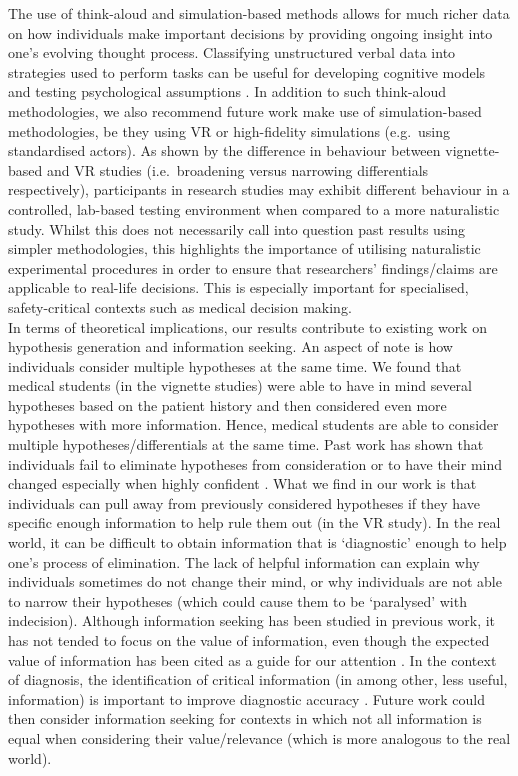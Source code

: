 \documentclass[a4paper, nobind]{templates/ociamthesis}
\begin{document}
The use of think-aloud and simulation-based methods allows for much richer data on how individuals make important decisions by providing ongoing insight into one's evolving thought process. Classifying unstructured verbal data into strategies used to perform tasks can be useful for developing cognitive models and testing psychological assumptions \autocite{ostrovsky_verbal_2024}. In addition to such think-aloud methodologies, we also recommend future work make use of simulation-based methodologies, be they using VR or high-fidelity simulations (e.g.~using standardised actors). As shown by the difference in behaviour between vignette-based and VR studies (i.e.~broadening versus narrowing differentials respectively), participants in research studies may exhibit different behaviour in a controlled, lab-based testing environment when compared to a more naturalistic study. Whilst this does not necessarily call into question past results using simpler methodologies, this highlights the importance of utilising naturalistic experimental procedures in order to ensure that researchers' findings/claims are applicable to real-life decisions. This is especially important for specialised, safety-critical contexts such as medical decision making.\\

In terms of theoretical implications, our results contribute to existing work on hypothesis generation and information seeking. An aspect of note is how individuals consider multiple hypotheses at the same time. We found that medical students (in the vignette studies) were able to have in mind several hypotheses based on the patient history and then considered even more hypotheses with more information. Hence, medical students are able to consider multiple hypotheses/differentials at the same time. Past work has shown that individuals fail to eliminate hypotheses from consideration \autocite{wason_failure_1960} or to have their mind changed \autocite{akaishi_autonomous_2014} especially when highly confident \autocite{rollwage_confidence_2020,pescetelli_confidence_2021}. What we find in our work is that individuals can pull away from previously considered hypotheses if they have specific enough information to help rule them out (in the VR study). In the real world, it can be difficult to obtain information that is `diagnostic' enough to help one's process of elimination. The lack of helpful information can explain why individuals sometimes do not change their mind, or why individuals are not able to narrow their hypotheses (which could cause them to be `paralysed' with indecision). Although information seeking has been studied in previous work, it has not tended to focus on the value of information, even though the expected value of information has been cited as a guide for our attention \autocite{manohar_attention_2013}. In the context of diagnosis, the identification of critical information (in among other, less useful, information) is important to improve diagnostic accuracy \autocite{kostopoulou_predictors_2008}. Future work could then consider information seeking for contexts in which not all information is equal when considering their value/relevance (which is more analogous to the real world).\\
\end{document}
